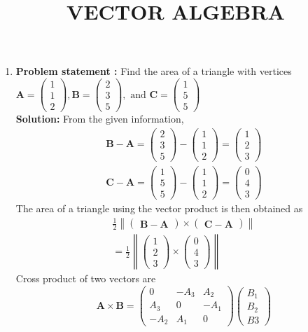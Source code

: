 \documentclass[12pt]{article}\usepackage{graphicx}
\title{\mytitle}
\newcommand{\myvec}[1]{\ensuremath{\begin{pmatrix}#1\end{pmatrix}}}
\let\vec\mathbf
\let\vec\mathbf
\providecommand{\norm}[1]{\left\lVert#1\right\rVert}
\newcommand{\solution}{\noindent \textbf{Solution: }}
\begin{document}
\begin{center}
\title{\textbf{VECTOR ALGEBRA}}
\maketitle
\end{center}
\begin{enumerate}
\item\textbf{Problem statement :} Find the area of a triangle with vertices
$
\vec{A} = \myvec{1\\1 \\2},
\vec{B} = \myvec{2\\3 \\5}, \text{ and }
\vec{C} = \myvec{1\\ 5\\5}
$
\\
\solution
From the given information, 
\begin{align}
\vec{B}-\vec{A}=\myvec{2\\3\\5}-\myvec{1\\1\\2} = \myvec{1\\2\\3}\\
\vec{C}-\vec{A}=\myvec{1\\5\\5}-\myvec{1\\1\\2}=\myvec{0\\4\\3}
\end{align}
The area of a triangle using the vector product is then obtained as
\begin{align}
        \frac{1}{2}\norm{\myvec{\vec{B}-\vec{A}}\times\myvec{\vec{C}-\vec{A}}} \\=\frac{1}{2}\norm{\myvec{1\\2\\3}\times \myvec{0\\4\\3}}
\end{align}
Cross product of two vectors are  
 \begin{equation}
      \vec{A}\times\vec{B} =\myvec{0&-A_3&A_2\\A_3&0&-A_1\\-A_2&A_1&0}\myvec{B_1\\B_2\\B3}
      \label{eq:product}
\end{equation}

\end{enumerate}
\end{document}
